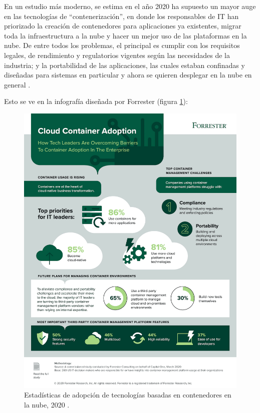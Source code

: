 En un estudio más moderno, se estima en el año 2020 ha supuesto un mayor auge en 
las tecnologías de ``contenerización'', en donde los responsables de IT han priorizado
la creación de contenedores para aplicaciones ya existentes, migrar toda la infraestructura
a la nube y hacer un mejor uso de las plataformas en la nube. De entre todos los
problemas, el principal es cumplir con los requisitos legales, de rendimiento y 
regulatorios vigentes según las necesidades de la industria; y la portabilidad
de las aplicaciones, las cuales estaban confinadas y diseñadas para sistemas en
particular y ahora se quieren desplegar en la nube en general \cite{ContainerAdoptionStatistics}.

Esto se ve en la infografía diseñada por Forrester (figura \ref{fig:container-stats}):

\begin{figure}[H]
    \centering
    \includegraphics[width=.85\linewidth]{pictures/container-adoption-statistics-infographic.png}
    \caption{Estadísticas de adopción de tecnologías basadas en contenedores en la nube, 2020 \cite{ContainerAdoptionStatistics}.}
    \label{fig:container-stats}
\end{figure}

